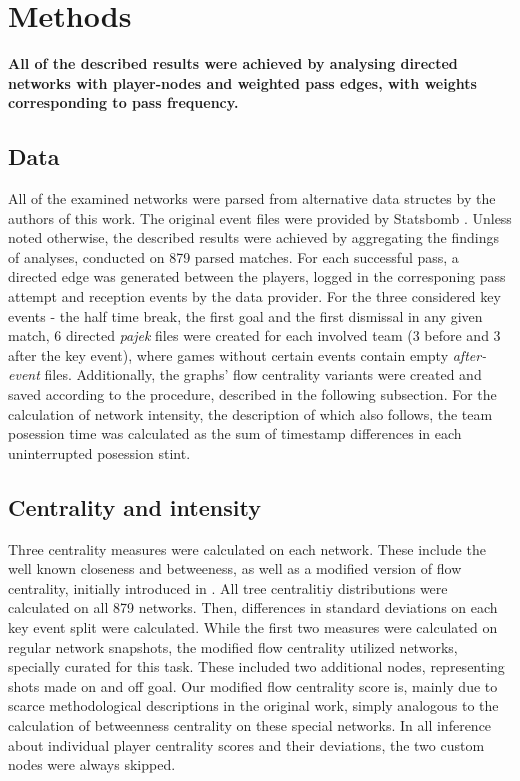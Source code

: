 \documentclass[9pt,twocolumn,twoside]{pnas-report}
\begin{document}
{\small\section*{Methods}

{\bf All of the described results were achieved by analysing directed networks with player-nodes and weighted pass edges, with weights corresponding to pass frequency.} 

\subsection*{Data}
All of the examined networks were parsed from alternative data structes by the authors of this work. The original event files were provided by Statsbomb \cite{statsbomb}. Unless noted otherwise, the described results were achieved by aggregating the findings of analyses, conducted on 879 parsed matches. For each successful pass, a directed edge was generated between the players, logged in the corresponing pass attempt and reception events by the data provider. For the three considered key events - the half time break, the first goal and the first dismissal in any given match, 6 directed \textit{pajek} files were created for each involved team (3 before and 3 after the key event), where games without certain events contain empty \textit{after-event} files. Additionally, the graphs' flow centrality variants were created and saved according to the procedure, described in the following subsection. For the calculation of network intensity, the description of which also follows, the team posession time was calculated as  the sum of timestamp differences in each uninterrupted posession stint.

\subsection*{Centrality and intensity}
Three centrality measures were calculated on each network. These include the well known closeness and betweeness, as well as a modified version of flow centrality, initially introduced in \cite{duch2010quantifying}. All tree centralitiy distributions were calculated on all 879 networks. Then, differences in standard deviations on each key event split were calculated. While the first two measures were calculated on regular network snapshots, the modified flow centrality utilized networks, specially curated for this task. These included two additional nodes, representing shots made on and off goal. Our modified flow centrality score is, mainly due to scarce methodological descriptions in the original work, simply analogous to the calculation of betweenness centrality on these special networks. In all inference about individual player centrality scores and their deviations, the two custom nodes were always skipped.

}
\end{document}
